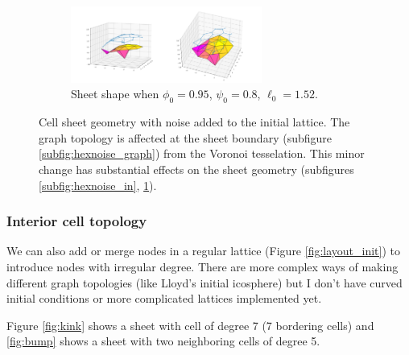 \documentclass[draft]{article}
\begin{document}
\begin{figure}[htbp]
\begin{subfigure}[b]{\textwidth}
        \includegraphics[width=0.69\textwidth]{figures/numerical/hexnoise/hexnoise0.95_0.8_1.52_10_plot.png}
        \caption{Sheet shape when $\phi_0=0.95$, $\psi_0=0.8$, $\ell_0=1.52$.}
        \label{subfig:hexnoise_out}
    \end{subfigure}
    \caption{Cell sheet geometry with noise added to the initial lattice. The graph topology is affected at the sheet boundary (subfigure \ref{subfig:hexnoise_graph}) from the Voronoi tesselation. This minor change has substantial effects on the sheet geometry (subfigures \ref{subfig:hexnoise_in}, \ref{subfig:hexnoise_out}).}
    \label{fig:hexnoise}
\end{figure}

\subsubsection{Interior cell topology}

We can also add or merge nodes in a regular lattice (Figure \ref{fig:layout_init}) to introduce nodes with irregular degree. There are more complex ways of making different graph topologies (like Lloyd's initial icosphere) but I don't have curved initial conditions or more complicated lattices implemented yet. 

Figure \ref{fig:kink} shows a sheet with cell of degree 7 (7 bordering cells) and \ref{fig:bump} shows a sheet with two neighboring cells of degree 5. 
\end{document}
